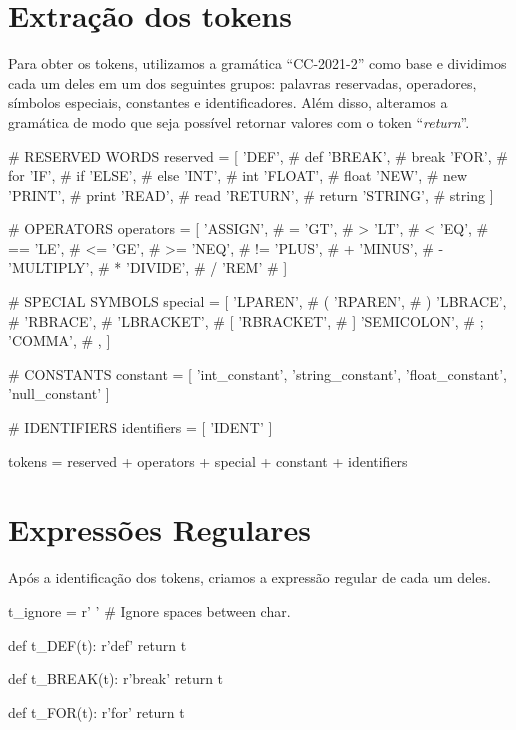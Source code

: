 \documentclass[
	12pt,				%
	openright,			%
	twoside,			%
	a4paper,			%
	english,			%
	french,				%
	spanish,			%
	brazil				%
	]{abntex2}
\begin{document}
\section{Extração dos tokens}
	Para obter os tokens, utilizamos a gramática ``CC-2021-2'' como base
    e dividimos cada um deles em um dos seguintes grupos: palavras reservadas,
	operadores, símbolos especiais, constantes e identificadores. Além disso,
	alteramos a gramática de modo que seja possível retornar valores com o token ``\emph{return}''.

\begin{python}
# RESERVED WORDS
reserved = [
    'DEF',         # def
    'BREAK',       # break
    'FOR',         # for
    'IF',          # if
    'ELSE',        # else
    'INT',         # int
    'FLOAT',       # float
    'NEW',         # new
    'PRINT',       # print
    'READ',        # read
    'RETURN',      # return
    'STRING',      # string
] 
\end{python}

\begin{python}
# OPERATORS
operators = [
    'ASSIGN',      # =
    'GT',          # >
    'LT',          # <
    'EQ',          # ==
    'LE',          # <=
    'GE',          # >=
    'NEQ',         # !=
    'PLUS',        # +
    'MINUS',       # -
    'MULTIPLY',    # *
    'DIVIDE',      # / 
    'REM'          # %
]
\end{python}
\newpage

\begin{python}
# SPECIAL SYMBOLS
special = [
    'LPAREN',      # (
    'RPAREN',      # )
    'LBRACE',      # {
    'RBRACE',      # }
    'LBRACKET',    # [
    'RBRACKET',    # ]
    'SEMICOLON',   # ;
    'COMMA',       # ,
]
\end{python}

\begin{python}
# CONSTANTS
constant = [
    'int_constant',
    'string_constant',
    'float_constant',
    'null_constant'
]
\end{python}

\begin{python}
# IDENTIFIERS
identifiers = [
    'IDENT'
]
\end{python}

\begin{python}
tokens = reserved + operators + special + constant + identifiers
\end{python}
\section{Expressões Regulares}
Após a identificação dos tokens, criamos a expressão regular de cada um deles.
\begin{python}
t_ignore = r' ' # Ignore spaces between char.

def t_DEF(t):
    r'def'
    return t

def t_BREAK(t):
    r'break'
    return t

def t_FOR(t):
    r'for'
    return t
\end{python}
\end{document}
